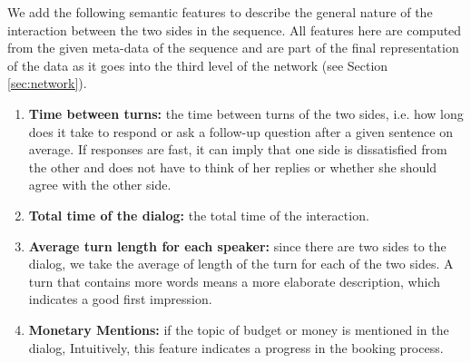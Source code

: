 



We add the following semantic features 
to describe the general nature 
of the interaction between the two sides 
in the sequence. All features here 
are computed from the given meta-data of the sequence and 
are part of the final representation of the data as it goes into the 
third level of the network (see Section \ref{sec:network}). 

\begin{enumerate}
\item {\bf Time between turns: } the time between 
turns of the two sides, i.e. how long does it take to respond or ask a follow-up 
question after a given sentence on average. 
If responses are fast, it can imply that one side is dissatisfied 
from the other and does not have to think of her replies or whether 
she should agree with the other side.\label{itm:between}

\item {\bf Total time of the dialog: } the total time of the interaction. \label{itm:total}

\item {\bf Average turn length for each speaker: } since there are two sides to the dialog, 
we take the average of length of the turn for each of the two sides. 
A turn that contains more words means a more elaborate description, which indicates 
a good first impression.\label{itm:sent}


\item {\bf Monetary Mentions: } if the topic of budget or money is mentioned in the dialog, 
Intuitively, this feature indicates a progress in the booking process.\label{itm:budget}

\end{enumerate} 

